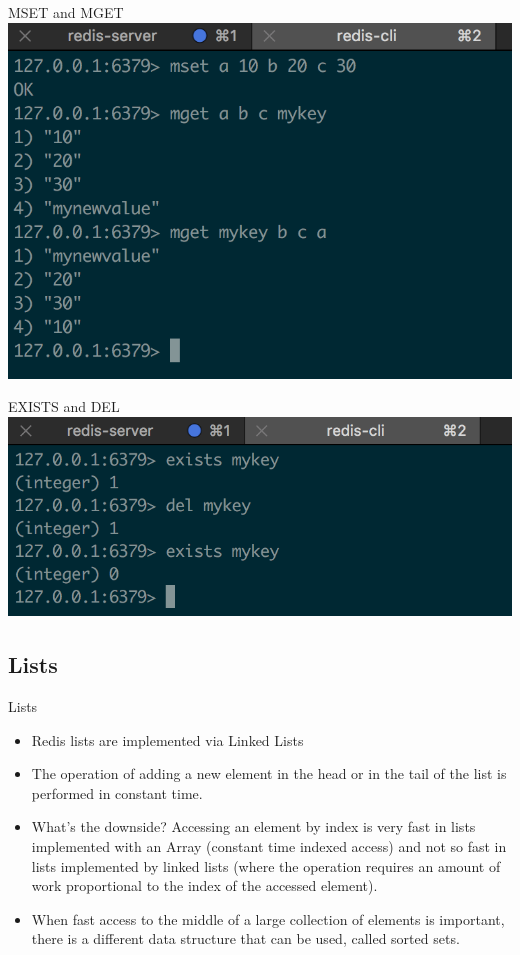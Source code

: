 \documentclass[10pt]{beamer}
\begin{document}
\begin{frame}[fragile]{MSET and MGET}
    \includegraphics[scale=0.9]{img/mset-mget}
\end{frame}

\begin{frame}[fragile]{EXISTS and DEL}
    \includegraphics[scale=0.7]{img/del-exists}
\end{frame}

\subsection{Lists}

\begin{frame}[fragile]{Lists}
  \begin{itemize}
    \item Redis lists are implemented via Linked Lists
    \item The operation of adding a new element in the head or in the tail of
    the list is performed in constant time.
    \item What's the downside? Accessing an element by index is very fast in
    lists implemented with an Array (constant time indexed access) and not so
    fast in lists implemented by linked lists (where the operation requires an
    amount of work proportional to the index of the accessed element).
    \item When fast access to the middle of a large collection of elements is
    important, there is a different data structure that can be used, called
    sorted sets.
  \end{itemize}
\end{frame}
\end{document}
